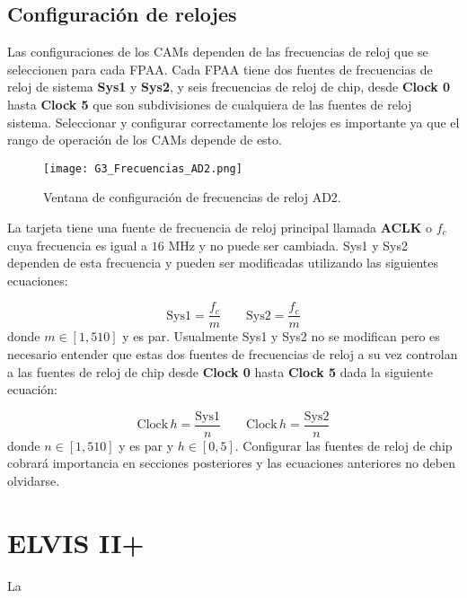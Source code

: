 	
	\subsection{Configuración de relojes}
	
	Las configuraciones de los CAMs dependen de las frecuencias de reloj que se seleccionen para cada FPAA. Cada FPAA tiene dos fuentes de frecuencias de reloj de sistema \textbf{Sys1} y \textbf{Sys2}, y seis frecuencias de reloj de chip, desde \textbf{Clock 0} hasta \textbf{Clock 5} que son subdivisiones de cualquiera de las fuentes de reloj sistema. Seleccionar y configurar correctamente los relojes es importante ya que el rango de operación de los CAMs depende de esto. 
	
\begin{figure}[!hbp] 
\caption{Ventana de configuración de frecuencias de reloj AD2.}
\label{fig:G3_Frecuencias_AD2.png}
\centering
\texttt{[image: G3\_Frecuencias\_AD2.png]}
\end{figure}

La tarjeta tiene una fuente de frecuencia de reloj principal llamada \textbf{ACLK} o $f_{c}$ cuya frecuencia es igual a $16$ MHz y no puede ser cambiada. Sys1 y Sys2 dependen de esta frecuencia y pueden ser modificadas utilizando las siguientes ecuaciones:

\begin{equation}
\mathrm{Sys1} = \frac{f_{c}}{m} \qquad \mathrm{Sys2} = \frac{f_{c}}{m}
\label{ec:sys_clock}
\end{equation}
donde $m\in [1,510]$ y es par. Usualmente Sys1 y Sys2 no se modifican pero es necesario entender que estas dos fuentes de frecuencias de reloj a su vez controlan a las fuentes de reloj de chip desde \textbf{Clock 0} hasta \textbf{Clock 5} dada la siguiente ecuación:

\begin{equation}
	\mathrm{Clock\,} h = \frac{\mathrm{Sys1}}{n}	\qquad   \mathrm{Clock\,} h = \frac{\mathrm{Sys2}}{n}
	\label{ec:clock_h}
\end{equation}
donde $n\in[1,510]$ y es par y $h\in[0,5]$. Configurar las fuentes de reloj de chip cobrará importancia en secciones posteriores y las ecuaciones anteriores no deben olvidarse.

\section{ELVIS II+}

La 

